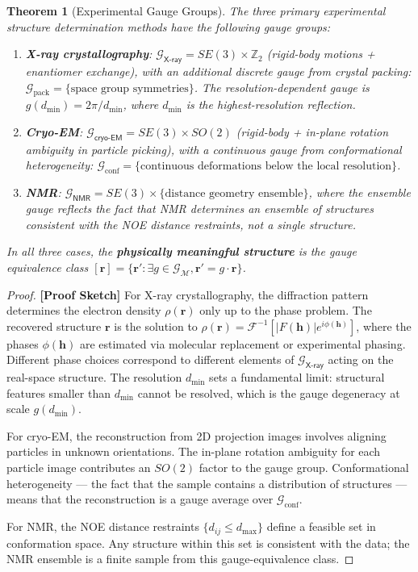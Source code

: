 \documentclass[12pt,a4paper]{article}
\newtheorem{theorem}{Theorem}[section]
\theoremstyle{remark}
\newcommand{\Z}{\mathbb{Z}}
\newcommand{\G}{\mathcal{G}}
\newcommand{\cryoEM}{\textsf{cryo-EM}}
\newcommand{\NMRspec}{\textsf{NMR}}
\newcommand{\Xray}{\textsf{X-ray}}
\newcommand{\rigorSketch}{\textbf{[Proof Sketch]}}
\begin{document}
\begin{theorem}[Experimental Gauge Groups]
\label{thm:exp-gauge}
The three primary experimental structure determination methods have the following gauge groups:
\begin{enumerate}[leftmargin=*,label=(\roman*)]
    \item \textbf{X-ray crystallography}: $\G_{\Xray} = SE(3) \times \Z_2$ (rigid-body motions + enantiomer exchange), with an additional discrete gauge from crystal packing: $\G_{\text{pack}} = \{\text{space group symmetries}\}$.
    The resolution-dependent gauge is $g(d_{\min}) = 2\pi / d_{\min}$, where $d_{\min}$ is the highest-resolution reflection.
    \item \textbf{Cryo-EM}: $\G_{\cryoEM} = SE(3) \times SO(2)$ (rigid-body + in-plane rotation ambiguity in particle picking), with a continuous gauge from conformational heterogeneity: $\G_{\text{conf}} = \{\text{continuous deformations below the local resolution}\}$.
    \item \textbf{NMR}: $\G_{\NMRspec} = SE(3) \times \{\text{distance geometry ensemble}\}$, where the ensemble gauge reflects the fact that NMR determines an \emph{ensemble} of structures consistent with the NOE distance restraints, not a single structure.
\end{enumerate}
In all three cases, the \textbf{physically meaningful structure} is the gauge equivalence class $[\mathbf{r}] = \{\mathbf{r}' : \exists g \in \G_{\mathcal{M}}, \mathbf{r}' = g \cdot \mathbf{r}\}$.
\end{theorem}

\begin{proof}
\rigorSketch
For X-ray crystallography, the diffraction pattern determines the electron density $\rho(\mathbf{r})$ only up to the phase problem.
The recovered structure $\mathbf{r}$ is the solution to $\rho(\mathbf{r}) = \mathcal{F}^{-1}[|F(\mathbf{h})| e^{i\phi(\mathbf{h})}]$, where the phases $\phi(\mathbf{h})$ are estimated via molecular replacement or experimental phasing.
Different phase choices correspond to different elements of $\G_{\Xray}$ acting on the real-space structure.
The resolution $d_{\min}$ sets a fundamental limit: structural features smaller than $d_{\min}$ cannot be resolved, which is the gauge degeneracy at scale $g(d_{\min})$.

For cryo-EM, the reconstruction from 2D projection images involves aligning particles in unknown orientations.
The in-plane rotation ambiguity for each particle image contributes an $SO(2)$ factor to the gauge group.
Conformational heterogeneity — the fact that the sample contains a distribution of structures — means that the reconstruction is a gauge average over $\G_{\text{conf}}$.

For NMR, the NOE distance restraints $\{d_{ij} \leq d_{\max}\}$ define a feasible set in conformation space.
Any structure within this set is consistent with the data; the NMR ensemble is a finite sample from this gauge-equivalence class.
\end{proof}
\end{document}
